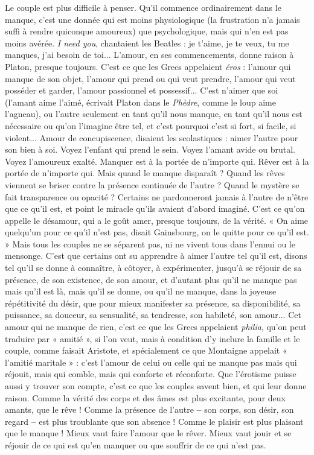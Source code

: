 Le couple est plus difficile à penser. Qu'il commence ordinairement dans le
manque, c’est une donnée qui est moins physiologique (la frustration n’a
jamais suffi à rendre quiconque amoureux) que psychologique, mais qui n’en
est pas moins avérée. {\it I need you}, chantaient les Beatles : je t’aime, je te veux, tu
me manques, j'ai besoin de toi... L'amour, en ses commencements, donne
raison à Platon, presque toujours. C’est ce que les Grecs appelaient {\it éros} :
l'amour qui manque de son objet, l'amour qui prend ou qui veut prendre,
l’amour qui veut posséder et garder, l’amour passionnel et possessif... C’est
n’aimer que soi (l'amant aime l’aimé, écrivait Platon dans le {\it Phèdre}, comme le
loup aime l’agneau), ou l’autre seulement en tant qu’il nous manque, en tant
qu'il nous est nécessaire ou qu’on l’imagine être tel, et c’est pourquoi c’est si
fort, si facile, si violent... Amour de concupiscence, disaient les scolastiques :
aimer l’autre pour son bien à soi. Voyez l'enfant qui prend le sein. Voyez
l’amant avide ou brutal. Voyez l’amoureux exalté. Manquer est à la portée de
n'importe qui. Rêver est à la portée de n’importe qui. Mais quand le manque
disparaît ? Quand les rêves viennent se briser contre la présence continuée de
l’autre ? Quand le mystère se fait transparence ou opacité ? Certains ne pardonneront
jamais à l’autre de n'être que ce qu'il est, et point le miracle qu'ils
avaient d’abord imaginé. C’est ce qu’on appelle le désamour, qui a le goût
amer, presque toujours, de la vérité. « On aime quelqu'un pour ce qu’il n’est
pas, disait Gainsbourg, on le quitte pour ce qu’il est. » Mais tous les couples ne
se séparent pas, ni ne vivent tous dans l’ennui ou le mensonge. C’est que certains
ont su apprendre à aimer l’autre tel qu’il est, disons tel qu’il se donne à
connaître, à côtoyer, à expérimenter, jusqu’à se réjouir de sa présence, de son
existence, de son amour, et d’autant plus qu’il ne manque pas mais qu’il est là,
mais qu'il se donne, ou qu’il ne manque, dans la joyeuse répétitivité du désir,
que pour mieux manifester sa présence, sa disponibilité, sa puissance, sa douceur,
sa sensualité, sa tendresse, son habileté, son amour... Cet amour qui ne
manque de rien, c’est ce que les Grecs appelaient {\it philia}, qu’on peut traduire
par « amitié », si l’on veut, mais à condition d’y inclure la famille et le couple,
comme faisait Aristote, et spécialement ce que Montaigne appelait « l'amitié
maritale » : c’est l’amour de celui ou celle qui ne manque pas mais qui réjouit,
mais qui comble, mais qui conforte et réconforte. Que l'érotisme puisse aussi y
trouver son compte, c'est ce que les couples savent bien, et qui leur donne
raison. Comme la vérité des corps et des âmes est plus excitante, pour deux
amants, que le rêve ! Comme la présence de l’autre {\bf --} son corps, son désir, son
regard {\bf --} est plus troublante que son absence ! Comme le plaisir est plus plaisant
que le manque ! Mieux vaut faire l'amour que le rêver. Mieux vaut jouir et se
réjouir de ce qui est qu’en manquer ou que souffrir de ce qui n’est pas.

